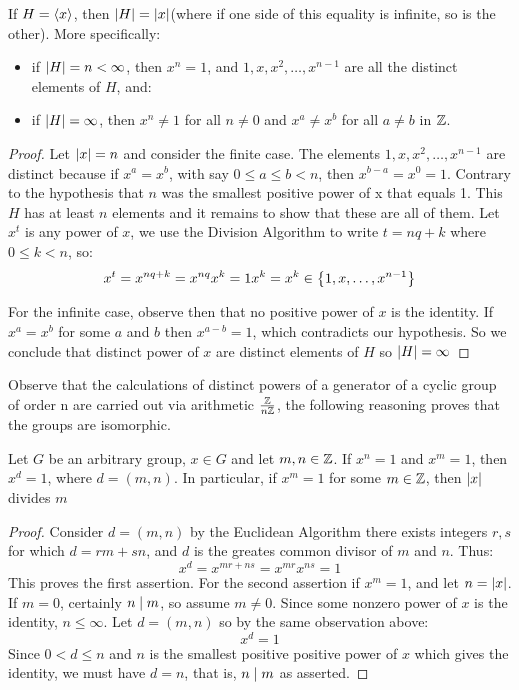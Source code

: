 \begin{prop}
	If $ H = \left\langle x \right\rangle $, then $ \left| H \right| = \left| x \right| $(where if one side of this equality is infinite, so is the other). More specifically:
	\begin{itemize}
		\item if $ \left| H \right| = n < \infty $, then $ x^n = 1$, and $ 1,x,x^2, \ldots,x^{n-1} $ are all the distinct elements of $ H $, and:
		\item if $ \left| H \right| = \infty $, then $ x^n \neq 1 $ for all $ n \neq 0 $ and $ x^{a} \neq x^b $ for all $ a \neq b $ in $ \mathbb{Z} $.
	\end{itemize}
\end{prop}
\begin{proof}
	Let $ \left| x \right| = n$ and consider the finite case. The elements $ 1,x,x^2, \ldots, x^{n-1} $ are distinct because if $ x^a = x^b  $, with say $ 0 \leq a \leq b < n $, then $ x^{b-a} = x^0 =1 $. Contrary to the hypothesis that $ n $ was the smallest positive power of x that equals 1. This $ H $ has at least $ n $ elements and it remains to show that these are all of them. Let $ x^t $ is any power of $ x $, we use the Division Algorithm to write $ t = nq + k  $ where $  0 \leq k < n $, so:
	\[ x^t = x^{nq + k}  = x^{nq}x^k = 1x^k = x^k \in \left\lbrace 1,x,\ldots,x^{n-1} \right\rbrace\]
	
	For the infinite case, observe then that no positive power of $ x $ is the identity. If $ x^a = x^b $ for some $ a $ and $ b $ then $ x^{a-b} = 1 $, which contradicts our hypothesis. So we conclude that distinct power of $ x $ are distinct elements of $ H $ so $ \left| H \right| = \infty $
\end{proof}
Observe that the calculations of distinct powers of a generator of a cyclic group of order n are carried out via arithmetic $ \frac{\mathbb{Z}}{n \mathbb{Z}} $, the following reasoning proves that the groups are isomorphic.

\begin{prop}
	Let $ G $ be an arbitrary group, $ x \in G $ and let $ m,n \in \mathbb{Z} $. If $ x^n = 1 $ and $ x^m = 1 $, then $ x^d = 1 $, where $ d = (m,n) $. In particular, if $ x^m = 1 $ for some $ m \in \mathbb{Z} $, then $ \left| x \right| $ divides $ m $
\end{prop}
\begin{proof}
	Consider $ d = (m,n) $ by the Euclidean Algorithm there exists integers $ r,s $ for which $ d = rm + sn $, and $ d $ is the greates common divisor of $ m $ and $ n $. Thus:
	\[ x^d = x^{mr + ns} = x^{mr}x^{ns} = 1 \]
	This proves the first assertion.
	For the second assertion if $ x^m = 1 $, and let $ n = \left| x \right| $. If $ m = 0 $, certainly $ n \mid m $, so assume $ m \neq 0 $. Since some nonzero power of $ x $ is the identity, $ n \leq \infty $. Let $ d = (m,n) $ so by the same observation above:
	\[ x^d = 1 \]
	Since $ 0 < d \leq n $ and $ n $ is the smallest positive positive power of $ x $ which gives the identity, we must have $ d = n $, that is, $ n \mid m $ as asserted.
\end{proof} 